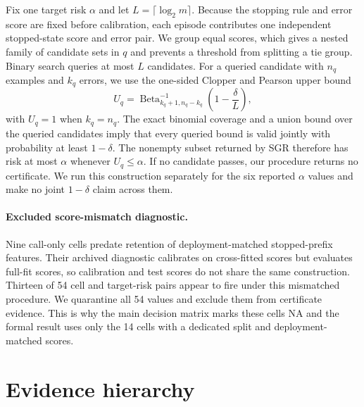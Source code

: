 \documentclass[manuscript,nonacm]{acmart}
\begin{document}
Fix one target risk $\alpha$ and let
$L=\lceil\log_2 m\rceil$. Because the stopping rule and error score are fixed
before calibration, each episode contributes one independent stopped-state
score and error pair. We group equal scores, which gives a nested family of
candidate sets in $q$ and prevents a threshold from splitting a tie group.
Binary search queries at most $L$ candidates. For a queried candidate with
$n_q$ examples and $k_q$ errors, we use the one-sided Clopper and Pearson upper
bound
\[
U_q=\operatorname{Beta}^{-1}_{k_q+1,n_q-k_q}\!\left(1-\frac{\delta}{L}\right),
\]
with $U_q=1$ when $k_q=n_q$. The exact binomial coverage and a union bound over
the queried candidates imply that every queried bound is valid jointly with
probability at least $1-\delta$. The nonempty subset returned by SGR therefore
has risk at most $\alpha$ whenever $U_q\le\alpha$. If no candidate passes, our
procedure returns no certificate. We run this construction separately for the
six reported $\alpha$ values and make no joint $1-\delta$ claim across them.

\paragraph{Excluded score-mismatch diagnostic.}
Nine call-only cells predate retention of deployment-matched stopped-prefix
features. Their archived diagnostic calibrates on cross-fitted scores but
evaluates full-fit scores, so calibration and test scores do not share the
same construction. Thirteen of 54 cell and target-risk pairs appear to fire
under this mismatched procedure. We quarantine all 54 values and exclude them
from certificate evidence. This is why the main decision matrix marks these
cells NA and the formal result uses only the 14 cells with a dedicated split
and deployment-matched scores.

\section{Evidence hierarchy}
\label{supp:hierarchy}
\end{document}
